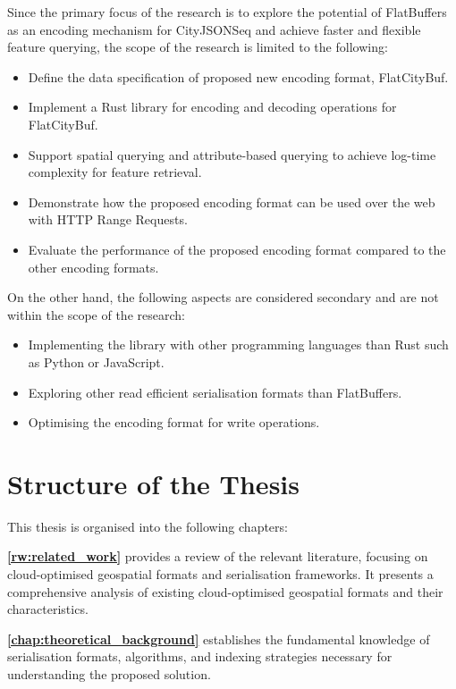 Since the primary focus of the research is to explore the potential of FlatBuffers as an encoding mechanism for CityJSONSeq and achieve faster and flexible feature querying, the scope of the research is limited to the following:

\begin{itemize}
  \item Define the data specification of proposed new encoding format, FlatCityBuf.
  \item Implement a Rust library for encoding and decoding operations for FlatCityBuf.
  \item Support spatial querying and attribute-based querying to achieve log-time complexity for feature retrieval.
  \item Demonstrate how the proposed encoding format can be used over the web with HTTP Range Requests.
  \item Evaluate the performance of the proposed encoding format compared to the other encoding formats.
\end{itemize}

On the other hand, the following aspects are considered secondary and are not within the scope of the research:
\begin{itemize}
  \item Implementing the library with other programming languages than Rust such as Python or JavaScript.
  \item Exploring other read efficient serialisation formats than FlatBuffers.
  \item Optimising the encoding format for write operations.
\end{itemize}

\section{Structure of the Thesis}
\label{introduction:structure_of_the_thesis}

This thesis is organised into the following chapters:

\textbf{\autoref{rw:related_work}} provides a review of the relevant literature, focusing on cloud-optimised geospatial formats and serialisation frameworks. It presents a comprehensive analysis of existing cloud-optimised geospatial formats and their characteristics.

\textbf{\autoref{chap:theoretical_background}} establishes the fundamental knowledge of serialisation formats, algorithms, and indexing strategies necessary for understanding the proposed solution.

